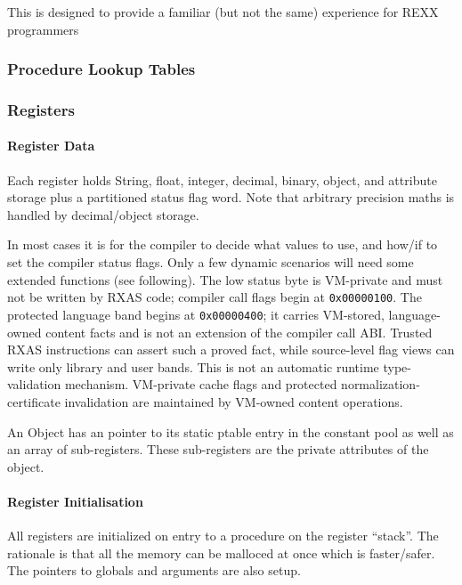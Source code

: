 This is designed to provide a familiar (but not the same) experience for
REXX programmers

\hypertarget{procedure-lookup-tables}{%
\subsubsection{Procedure Lookup Tables}\label{procedure-lookup-tables}}

\hypertarget{registers}{%
\subsubsection{Registers}\label{registers}}

\hypertarget{register-data}{%
\paragraph{Register Data}\label{register-data}}

Each register holds String, float, integer, decimal, binary, object, and
attribute storage plus a partitioned status flag word. Note that arbitrary
precision maths is handled by decimal/object storage.

In most cases it is for the compiler to decide what values to use, and
how/if to set the compiler status flags. Only a few dynamic scenarios will need
some extended functions (see following). The low status byte is VM-private and
must not be written by RXAS code; compiler call flags begin at
\texttt{0x00000100}. The protected language band begins at
\texttt{0x00000400}; it carries VM-stored, language-owned content facts and is
not an extension of the compiler call ABI. Trusted RXAS instructions can assert
such a proved fact, while source-level flag views can write only library and
user bands. This is not an automatic runtime type-validation mechanism.
VM-private cache flags and protected normalization-certificate invalidation are
maintained by VM-owned content operations.

An Object has an pointer to its static ptable entry in the constant pool
as well as an array of sub-registers. These sub-registers are the
private attributes of the object.

\hypertarget{register-initialisation}{%
\paragraph{Register Initialisation}\label{register-initialisation}}

All registers are initialized on entry to a procedure on the register
``stack''. The rationale is that all the memory can be malloced at once
which is faster/safer. The pointers to globals and arguments are also
setup.

